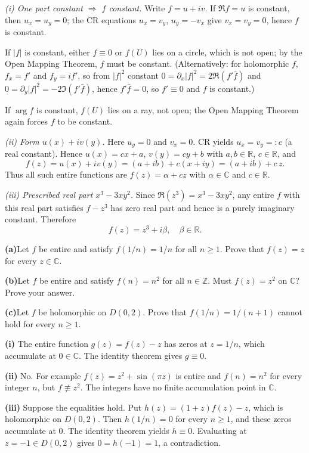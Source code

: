 \begin{solution}
\emph{(i) One part constant $\Rightarrow$ $f$ constant.}
Write $f=u+iv$.
If $\Re f=u$ is constant, then $u_x=u_y=0$; the CR equations $u_x=v_y$, $u_y=-v_x$ give $v_x=v_y=0$, hence $f$ is constant.

If $|f|$ is constant, either $f\equiv0$ or $f(U)$ lies on a circle, which is not open; by the Open Mapping Theorem, $f$ must be constant.
(Alternatively: for holomorphic $f$, $f_x=f'$ and $f_y=i f'$, so from $|f|^2$ constant
$0=\partial_x|f|^2=2\Re(f'\bar f)$ and $0=\partial_y|f|^2=-2\Im(f'\bar f)$, hence $f'\bar f=0$, so $f'\equiv0$ and $f$ is constant.)

If $\arg f$ is constant, $f(U)$ lies on a ray, not open; the Open Mapping Theorem again forces $f$ to be constant.

\medskip
\emph{(ii) Form $u(x)+i v(y)$.}
Here $u_y=0$ and $v_x=0$. CR yields $u_x=v_y=:c$ (a real constant). Hence
$u(x)=cx+a$, $v(y)=cy+b$ with $a,b\in\mathbb R$, $c\in\mathbb R$, and
\[
f(z)=u(x)+i v(y)=(a+ib)+c(x+iy)=(a+ib)+c\,z.
\]
Thus all such entire functions are $f(z)=\alpha + c z$ with $\alpha\in\mathbb C$ and $c\in\mathbb R$.

\medskip
\emph{(iii) Prescribed real part $x^3-3xy^2$.}
Since $\Re(z^3)=x^3-3xy^2$, any entire $f$ with this real part satisfies $f-z^3$ has zero real part and hence is a purely imaginary constant. Therefore
\[
\boxed{\,f(z)=z^3+i\beta,\quad \beta\in\mathbb R.\,}
\]
\end{solution}

\begin{problem}[CP-IV-0077]
\label{prob:cp-iv-0077}

\par\medskip\noindent\textbf{(a)}\quad Let $f$ be entire and satisfy $f(1/n)=1/n$ for all $n\ge1$. Prove that $f(z)=z$ for every $z\in\mathbb C$.

\par\medskip\noindent\textbf{(b)}\quad Let $f$ be entire and satisfy $f(n)=n^2$ for all $n\in\mathbb Z$. Must $f(z)=z^2$ on $\mathbb C$? Prove your answer.

\par\medskip\noindent\textbf{(c)}\quad Let $f$ be holomorphic on $D(0,2)$. Prove that $f(1/n)=1/(n+1)$ cannot hold for every $n\ge1$.

\end{problem}

\begin{solution}
\textbf{(i)} The entire function $g(z)=f(z)-z$ has zeros at $z=1/n$, which accumulate at $0\in\mathbb C$. The identity theorem gives $g\equiv0$.

\textbf{(ii)} No. For example $f(z)=z^2+\sin(\pi z)$ is entire and $f(n)=n^2$ for every integer $n$, but $f\not\equiv z^2$. The integers have no finite accumulation point in $\mathbb C$.

\textbf{(iii)} Suppose the equalities hold. Put $h(z)=(1+z)f(z)-z$, which is holomorphic on $D(0,2)$. Then $h(1/n)=0$ for every $n\ge1$, and these zeros accumulate at $0$. The identity theorem yields $h\equiv0$. Evaluating at $z=-1\in D(0,2)$ gives $0=h(-1)=1$, a contradiction.
\end{solution}


